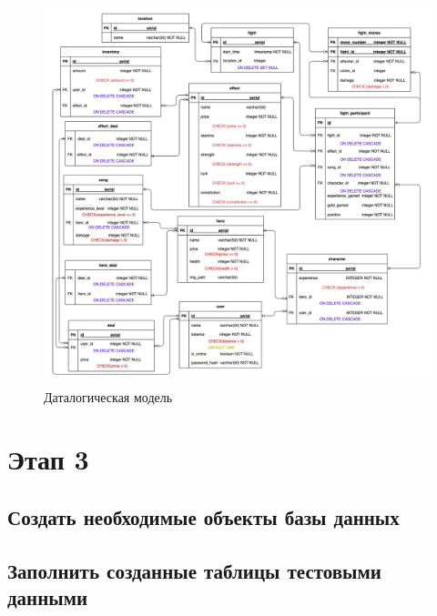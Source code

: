 \begin{figure}[H]
	\begin{center}
		\includegraphics[scale=0.44]{images/Datalogical.jpg}
		\caption{Даталогическая модель}
		\label{pic:pic_name} %
	\end{center}
\end{figure}

\newpage

\section*{Этап 3}



\subsection*{Создать необходимые объекты базы данных}



\subsection*{Заполнить созданные таблицы тестовыми данными}

